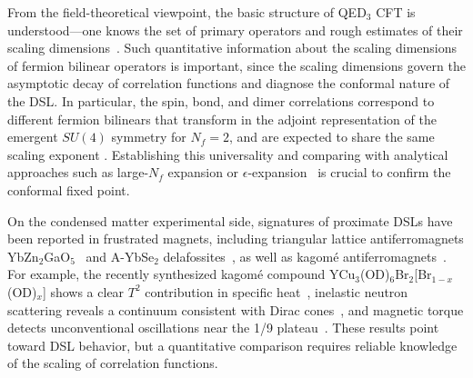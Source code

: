 \documentclass[aps,prl,twocolumn,superscriptaddress,showpacs,longbibliography]{revtex4-2}
\begin{document}
From the field-theoretical viewpoint, the basic structure of QED$_3$ CFT is understood—one knows the set of primary operators and rough estimates of their scaling dimensions~\cite{di2017scaling,chester2016towards,Albayrak2022}. Such quantitative information about the scaling dimensions of fermion bilinear operators is important, since the scaling dimensions govern the asymptotic decay of correlation functions and diagnose the conformal nature of the DSL.
In particular, the spin, bond, and dimer correlations correspond to different fermion bilinears that transform in the adjoint representation of the emergent $SU(4)$ symmetry for $N_f=2$, and are expected to share the same scaling exponent \cite{rantner2002spin, Hermele2005}. Establishing this universality and comparing with analytical approaches such as large-$N_f$ expansion or $\epsilon$-expansion~\cite{di2017scaling,chester2016towards} is crucial to confirm the conformal fixed point. 

On the condensed matter experimental side, signatures of proximate DSLs have been reported in frustrated magnets, including triangular lattice antiferromagnets YbZn$_2$GaO$_5$~\cite{BagEvidence24,WuSpinDynamics25} and A-YbSe$_2$ delafossites~\cite{ScheieKYbSe2,ScheieNaYbSe2}, as well as kagom\'e antiferromagnets~\cite{zengPossible2022,zengSpectral2024,hanSpin2024,suetsuguEmergent2024,suetsuguGapless2024,jeonOne2024,zhengUnconventional2025}. For example, the recently synthesized kagom\'e compound YCu$_3$(OD)$_6$Br$_2$[Br$_{1-x}$(OD)$_x$] shows a clear $T^2$ contribution in specific heat~\cite{zengPossible2022}, inelastic neutron scattering reveals a continuum consistent with Dirac cones~\cite{zengSpectral2024,hanSpin2024}, and magnetic torque detects unconventional oscillations near the 1/9 plateau~\cite{zhengUnconventional2025}. These results point toward DSL behavior, but a quantitative comparison requires reliable knowledge of the scaling of correlation functions.
\end{document}
